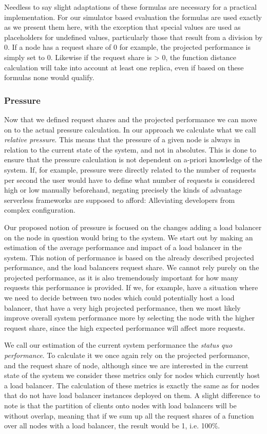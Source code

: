 \documentclass[draft,final]{vutinfth} %
\begin{document}
Needless to say slight adaptations of these formulas are necessary for a practical implementation.
For our simulator based evaluation the formulas are used exactly as we present them here, with the exception that special values are used as placeholders for undefined values, particularly those that result from a division by 0.
If a node has a request share of 0 for example, the projected performance is simply set to 0.
Likewise if the request share is > 0, the function distance calculation will take into account at least one replica, even if based on these formulas none would qualify.


\subsubsection{Pressure}
Now that we defined request shares and the projected performance we can move on to the actual pressure calculation.
In our approach we calculate what we call \textit{relative pressure}.
This means that the pressure of a given node is always in relation to the current state of the system, and not in absolutes.
This is done to ensure that the pressure calculation is not dependent on a-priori knowledge of the system.
If, for example, pressure were directly related to the number of requests per second the user would have to define what number of requests is considered high or low manually beforehand, negating precisely the kinds of advantage serverless frameworks are supposed to afford: Alleviating developers from complex configuration.

Our proposed notion of pressure is focused on the changes adding a load balancer on the node in question would bring to the system.
We start out by making an estimation of the average performance and impact of a load balancer in the system.
This notion of performance is based on the already described projected performance, and the load balancers request share.
We cannot rely purely on the projected performance, as it is also tremendously important for how many requests this performance is provided.
If we, for example, have a situation where we need to decide between two nodes which could potentially host a load balancer, that have a very high projected performance, then we most likely improve overall system performance more by selecting the node with the higher request share, since the high expected performance will affect more requests.

We call our estimation of the current system performance the \textit{status quo performance}.
To calculate it we once again rely on the projected performance, and the request share of node, although since we are interested in the current state of the system we consider these metrics only for nodes which currently host a load balancer.
The calculation of these metrics is exactly the same as for nodes that do not have load balancer instances deployed on them.
A slight difference to note is that the partition of clients onto nodes with load balancers will be without overlap, meaning that if we sum up all the request shares of a function over all nodes with a load balancer, the result would be 1, i.e. 100\%.
\end{document}
